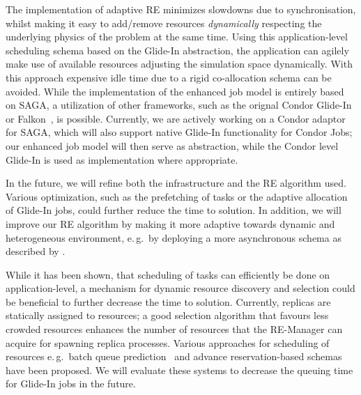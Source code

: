 \documentclass{rspublic}
\newcommand{\alnote}[1]{ {\textcolor{blue} { ***AL: #1 }}}
\newcommand{\alnote}[1]{}
\newcommand{\glidein}[1]{Glide-In }
\begin{document}
{The implementation of adaptive RE minimizes slowdowns due to synchronisation, 
whilst making it easy to add/remove resources {\it dynamically} respecting the
underlying phys\-ics of the problem at the same time. 
Using this application-level scheduling schema based on the Glide-In abstraction,
the application can agilely make use of available resources adjusting
the simulation space dynamically. With this approach expensive idle 
time due to a rigid co-allocation schema can be avoided. 
While the implementation of the enhanced job model is entirely based
on SAGA, a utilization of other frameworks, such as the orignal Condor
Glide-In~\citep{citeulike:291860} or Falkon~\citep{1362680}, is
possible. Currently, we are actively working on a Condor adaptor for
SAGA, which will also support native Glide-In functionality for Condor
Jobs; our enhanced job model will then serve as abstraction, while the
Condor level Glide-In is used as implementation where appropriate.

   
In the future, we will refine both the infrastructure and the RE algorithm
used. Various optimization, such as the prefetching of tasks or the 
adaptive allocation of Glide-In jobs, could further reduce the time
to solution. In addition, we will improve our RE algorithm by making it
more adaptive towards dynamic and heterogeneous environment, 
e.\,g.\ by deploying  a more asynchronous schema
as described by \citet{Gallicchio:2007yq}.

While it has been shown, that scheduling of tasks can efficiently be done on 
application-level, a mechanism for dynamic resource discovery and selection 
could be beneficial to further decrease the time to solution. Currently, replicas are 
statically assigned to resources; a good selection algorithm that favours
less crowded resources enhances the number of resources that the RE-Manager
can acquire for spawning replica processes. Various approaches for 
scheduling of resources  e.\,g.\ batch queue 
prediction~\citep{1254939,Chakraborty:2008nx} and advance reservation-based 
schemas~\citep{Jeske:2007wj} have been proposed. We will evaluate these systems
to decrease the queuing time for Glide-In jobs in the future.

}
\end{document}
